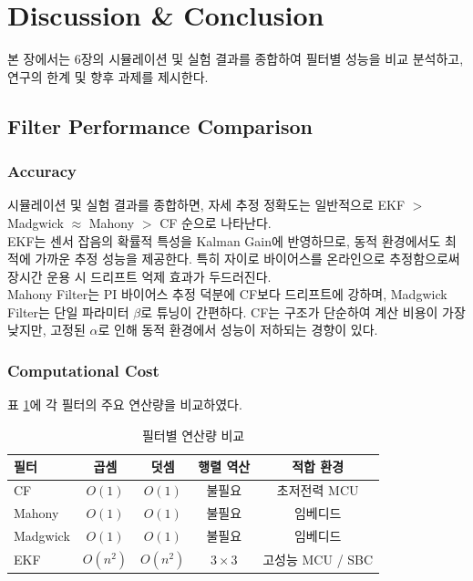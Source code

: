 \section{Discussion \& Conclusion}
    본 장에서는 6장의 시뮬레이션 및 실험 결과를 종합하여 필터별 성능을 비교 분석하고, 연구의 한계 및 향후 과제를 제시한다.\\
    
    \subsection{Filter Performance Comparison}
        \subsubsection{Accuracy}
            시뮬레이션 및 실험 결과를 종합하면, 자세 추정 정확도는 일반적으로 EKF $>$ Madgwick $\approx$ Mahony $>$ CF 순으로 나타난다.\\
 
            EKF는 센서 잡음의 확률적 특성을 Kalman Gain에 반영하므로, 동적 환경에서도 최적에 가까운 추정 성능을 제공한다. 특히 자이로 바이어스를 온라인으로 추정함으로써 장시간 운용 시 드리프트 억제 효과가 두드러진다.\\
 
            Mahony Filter는 PI 바이어스 추정 덕분에 CF보다 드리프트에 강하며, Madgwick Filter는 단일 파라미터 $\beta$로 튜닝이 간편하다. CF는 구조가 단순하여 계산 비용이 가장 낮지만, 고정된 $\alpha$로 인해 동적 환경에서 성능이 저하되는 경향이 있다.\\
        
        \subsubsection{Computational Cost}
            표 \ref{tab:compute_cost}에 각 필터의 주요 연산량을 비교하였다.\\
 
            \begin{table}[H]
                \centering
                \caption{필터별 연산량 비교}
                \label{tab:compute_cost}
                \begin{tabular}{lcccc}
                    \toprule
                    필터 & 곱셈 & 덧셈 & 행렬 역산 & 적합 환경 \\
                    \midrule
                    CF       & $O(1)$ & $O(1)$ & 불필요 & 초저전력 MCU \\
                    Mahony   & $O(1)$ & $O(1)$ & 불필요 & 임베디드 \\
                    Madgwick & $O(1)$ & $O(1)$ & 불필요 & 임베디드 \\
                    EKF      & $O(n^2)$ & $O(n^2)$ & $3\times 3$ & 고성능 MCU / SBC \\
                    \bottomrule
                \end{tabular}
            \end{table}

